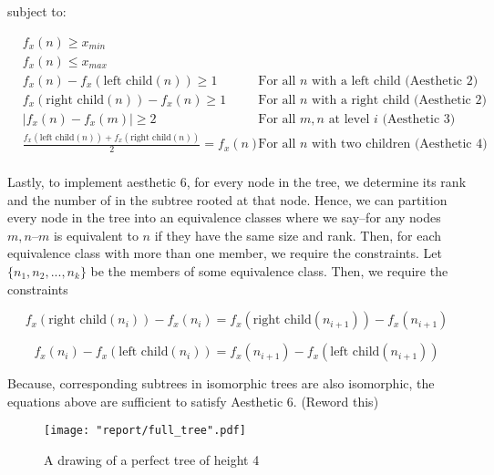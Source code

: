 \documentclass[11pt]{report}
\newcommand{\abs}[1]{\left|#1\right|}
\newcommand{\leftc}[1]{\text{left child}\left(#1\right)}
\newcommand{\rightc}[1]{\text{right child}\left(#1\right)}
\begin{document}
subject to:

\[
\begin{aligned}
    &f_x(n) \geq x_{min} \\
    &f_x(n) \leq x_{max} \\
    &f_x(n) - f_x( \leftc{n} ) \geq 1 &\text{For all $n$ with a left child (Aesthetic 2)} \\
    &f_x( \rightc{n} ) - f_x(n) \geq 1 &\text{For all $n$ with a right child (Aesthetic 2)} \\
    &\abs{f_x(n) - f_x(m)} \geq 2 &\text{For all $m, n$ at level $i$ (Aesthetic 3)} \\
    &\frac{ f_x(\leftc{n}) + f_x(\rightc{n}) }{2} = f_x(n)
         &\text{For all $n$ with two children (Aesthetic 4)} \\
\end{aligned}
\]

Lastly, to implement aesthetic 6, for every node in the tree, we determine its rank and the number of in the subtree rooted at that node. Hence, we can partition every node in the tree into an equivalence classes where we say--for any nodes $m, n$--$m$ is equivalent to $n$ if they have the same size and rank. Then, for each equivalence class with more than one member, we require the constraints. Let $\{ n_1, n_2, ..., n_k \}$ be the members of some equivalence class. Then, we require the constraints

\begin{equation}
    f_x( \rightc{n_i} ) - f_x(n_i) = f_x( \rightc{n_{i + 1}} ) - f_x( n_{i + 1} )
\end{equation}

\begin{equation}
    f_x( n_i ) - f_x( \leftc{n_i} ) = f_x( n_{i + 1} ) - f_x( \leftc{n_{i+1}} )
\end{equation}

Because, corresponding subtrees in isomorphic trees are also isomorphic, the equations above are sufficient to satisfy Aesthetic 6. (Reword this)

\begin{figure}[H]
    \centering
    \texttt{[image: "report/full\_tree".pdf]}
    \caption{A drawing of a perfect tree of height 4}
\end{figure}
\end{document}
